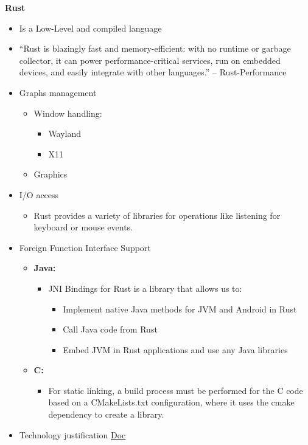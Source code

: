 \textbf{Rust}
\begin{itemize}
    \item Is a Low-Level and compiled language
    \item ``Rust is blazingly fast and memory-efficient: with no runtime or garbage collector, it can power performance-critical services, run on embedded devices, and easily integrate with other languages.'' – Rust-Performance
    \item Graphs management
    \begin{itemize}
        \item Window handling: 
        \begin{itemize}
            \item Wayland
            \item X11
        \end{itemize}
        \item Graphics
    \end{itemize}
    \item I/O access
    \begin{itemize}
        \item Rust provides a variety of libraries for operations like listening for keyboard or mouse events.
    \end{itemize}
    \item Foreign Function Interface Support
    \begin{itemize}
        \item \textbf{Java:}
        \begin{itemize}
            \item JNI Bindings for Rust is a library that allows us to:
            \begin{itemize}
                \item Implement native Java methods for JVM and Android in Rust
                \item Call Java code from Rust
                \item Embed JVM in Rust applications and use any Java libraries
            \end{itemize}
    
        \end{itemize}
        \item \textbf{C:}
        \begin{itemize}
            \item For static linking, a build process must be performed for the C code based on a CMakeLists.txt configuration, where it uses the cmake dependency to create a library.
        
        \end{itemize}
    \end{itemize}
    \item Technology justification \href{https://docs.google.com/document/d/1OWdCxe9lFPcMpADiyAyRCWGAioo0fwIuzMuRER24MHM/edit}{Doc}
\end{itemize}
